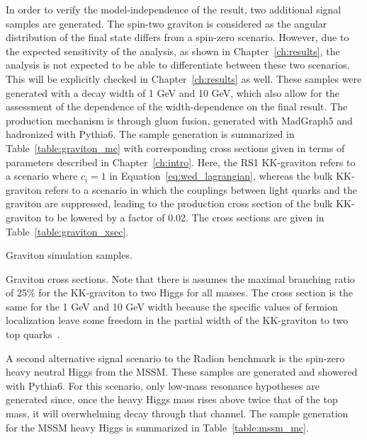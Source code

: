 In order to verify the model-independence of the result, two additional signal samples are generated.
The spin-two graviton is considered as the angular distribution of the final state differs from a
spin-zero scenario. However, due to the expected sensitivity of the analysis, as shown in
Chapter~\ref{ch:results}, the analysis is not expected to be able to differentiate between
these two scenarios. This will be explicitly checked in Chapter~\ref{ch:results} as well.
These samples were generated with a decay width of 1 GeV and 10 GeV,
which also allow for the assessment of the
dependence of the width-dependence on the final result. The production mechanism is through
gluon fusion, generated with MadGraph5 and hadronized with Pythia6. The sample generation
is summarized in Table~\ref{table:graviton_mc} with corresponding cross sections given in terms of
parameters described in Chapter~\ref{ch:intro}. Here, the RS1 KK-graviton refers to a scenario
where $c_i = 1$ in Equation~\ref{eq:wed_lagrangian}, whereas the bulk KK-graviton refers to a scenario
in which the couplings between light quarks and the graviton are suppressed, leading to the
production cross section of the bulk KK-graviton to be lowered by a factor of 0.02. The cross sections
are given in Table~\ref{table:graviton_xsec}.

\begin{table}[ht]
  \centering
  \renewcommand{\arraystretch}{1.4}
  \caption{Graviton simulation samples.}
  
  \label{table:graviton_mc}
\end{table}

\begin{table}[ht]
  \centering
  \renewcommand{\arraystretch}{1.4}
  \caption{Graviton cross sections. Note that there is assumes the maximal
branching ratio of 25\% for the KK-graviton to two Higgs for all masses. The cross section is the
same for the 1 GeV and 10 GeV width because the specific values of fermion localization leave some
freedom in the partial width of the KK-graviton to two top quarks~\cite{Agashe:2007zd}.}
  
  \label{table:graviton_xsec}
\end{table}

A second alternative signal scenario to the Radion benchmark is the spin-zero heavy neutral Higgs from
the MSSM. These samples are generated and showered with Pythia6. For this scenario, only low-mass
resonance hypotheses are generated since, once the heavy Higgs mass rises above twice that of the top
mass, it will overwhelming decay through that channel. The sample generation for the MSSM heavy
Higgs is summarized in Table~\ref{table:mssm_mc}.

